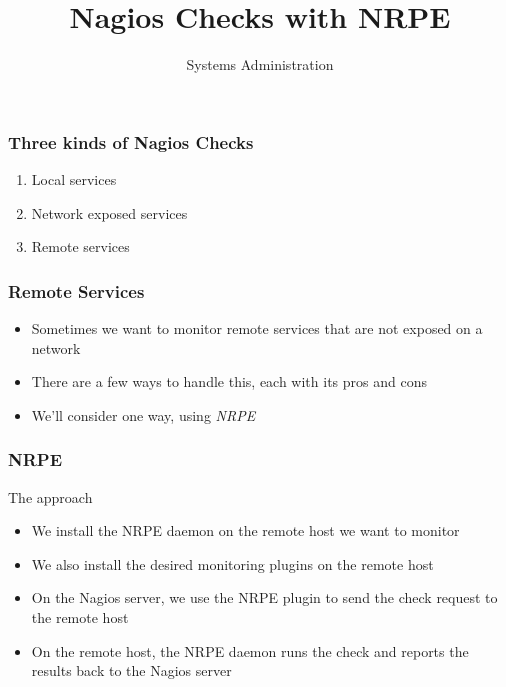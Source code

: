 \documentclass[10pt]{beamer}
\title{Nagios Checks with NRPE}
\author[IN719]{Systems Administration}
\institute[Otago Polytechnic]{
  School of Information Technology \\
  Otago Polytechnic \\
  Dunedin, New Zealand \\
}
\date{}
\begin{document}
\begin{frame}[plain]
  \titlepage
\end{frame}

\begin{frame}
  \frametitle{Three kinds of Nagios Checks}


\begin{enumerate}
  \item Local services
  \item Network exposed services
  \item Remote services
\end{enumerate}

\end{frame}


\begin{frame}
  \frametitle{Remote Services}


\begin{itemize}
  \item Sometimes we want to monitor remote services that are not exposed on a network
  \item There are a few ways to handle this, each with its pros and cons
  \item We'll consider one way, using \emph{NRPE}
\end{itemize}

\end{frame}

\begin{frame}
  \frametitle{NRPE}

The approach
\begin{itemize}
  \item We install the NRPE daemon on the remote host we want to monitor
  \item We also install the desired monitoring plugins on the remote host
  \item On the Nagios server, we use the NRPE plugin to send the check request
        to the remote host
  \item On the remote host, the NRPE daemon runs the check and reports the results
        back to the Nagios server
\end{itemize}
\end{frame}
\end{document}
